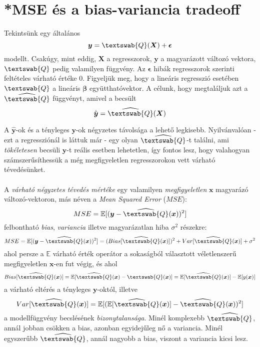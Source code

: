 \documentclass[14p]{report}
\def\pmb{\boldsymbol}
\def\e{\epsilon}
\begin{document}
	\section{*MSE és a bias-variancia tradeoff}
	Tekintsünk egy általános
	\[
		\pmb{y} = \textswab{Q}(\pmb{X}) + \pmb{\e}
	\]
	modellt. Csakúgy, mint eddig, $\pmb{X}$ a regresszorok, $\pmb{y}$ a magyarázott változó vektora, $\textswab{Q}$ pedig valamilyen függvény. Az $\pmb{\e}$ hibák regresszorok szerinti feltételes várható értéke $0$. Figyeljük meg, hogy a lineáris regresszió esetében $\textswab{Q}$ a lineáris $\pmb{\beta}$ együtthatóvektor. A célunk, hogy megtaláljuk azt a $\widehat{\textswab{Q}}$ függvényt, amivel a becsült
	\[
		\hat{\pmb{y}} = \widehat{\textswab{Q}}(\pmb{X})
	\]
	
	A $\hat{\pmb{y}}$-ok és a tényleges $\pmb{y}$-ok négyzetes távolsága a lehető legkisebb. Nyilvánvalóan - ezt a regressziónál is láttuk már - egy olyan $\widehat{\textswab{Q}}$-t találni, ami \emph{tökéletesen} becsüli $\pmb{y}$-t reális esetben lehetetlen, így fontos lesz, hogy valahogyan számszerűsíthessük a még megfigyeletlen regresszorokon vett várható tévedésünket.
	\\
	\\
	A \emph{várható négyzetes tévedés mértéke} egy valamilyen \emph{megfigyeletlen} $\pmb{x}$ magyarázó változó-vektoron, más néven a \emph{Mean Squared Error} ($MSE$):
	\[
		MSE = \mathbb{E}[(\pmb{y} - \widehat{\textswab{Q}}(\pmb{x}))^2]
	\]
	felbontható \emph{bias}, \emph{variancia} illetve magyarázatlan hiba $\sigma^2$ részekre:
	\[
		MSE = \mathbb{E}[(\pmb{y} - \widehat{\textswab{Q}}(\pmb{x}))^2] = (Bias[\widehat{\textswab{Q}}(\pmb{x})])^2 + Var[\widehat{\textswab{Q}}(\pmb{x})] + \sigma^2
	\]
	ahol persze a $\mathbb{E}$ várható érték operátor a sokaságból választott véletlenszerű megfigyeletlen $\pmb{x}$-en fut végig, és ahol
	\[
		Bias[\widehat{\textswab{Q}}(\pmb{x})] = \mathbb{E}[\widehat{\textswab{Q}}(\pmb{x}) - \textswab{Q}(\pmb{x})] = \mathbb{E}[\widehat{\textswab{Q}}(\pmb{x})] - \mathbb{E}[y(\pmb{x})]
	\]
	a várható eltérés a tényleges $\pmb{y}$-októl, illetve
	\[
		Var[\widehat{\textswab{Q}}(\pmb{x})] = \mathbb{E}[(\mathbb{E}[\widehat{\textswab{Q}}(\pmb{x})] - \widehat{\textswab{Q}}(\pmb{x}))^2]
	\]
	a modellfüggvény becslésének \emph{bizonytalansága}. Minél komplexebb $\widehat{\textswab{Q}}$, annál jobban csökken a bias, azonban egyidejűleg nő a variancia. Minél egyszerűbb $\widehat{\textswab{Q}}$, annál nagyobb a bias, viszont a variancia kicsi lesz. 
	
\end{document}

